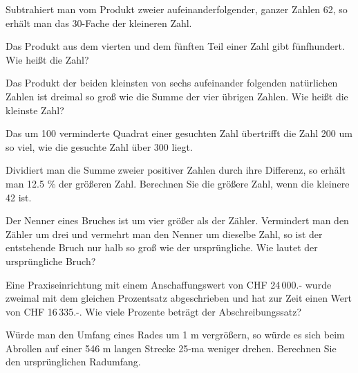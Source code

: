 \begin{bbwAufgabenBlock}
\item Subtrahiert man vom Produkt zweier aufeinanderfolgender, ganzer
Zahlen 62, so erhält man das 30-Fache der kleineren Zahl.


\item Das Produkt aus dem vierten und dem fünften Teil einer Zahl gibt
fünfhundert. Wie heißt die Zahl?


\item Das Produkt der beiden kleinsten von sechs aufeinander folgenden
natürlichen Zahlen ist dreimal so groß wie die Summe der vier übrigen
Zahlen. Wie heißt die kleinste Zahl?


\item Das um 100 verminderte Quadrat einer gesuchten Zahl übertrifft
die Zahl 200 um so viel, wie die gesuchte Zahl über 300 liegt.


\item Dividiert man die Summe zweier positiver Zahlen durch ihre
Differenz, so erhält man 12.5 \% der größeren Zahl. Berechnen Sie die
größere Zahl, wenn die kleinere 42 ist.


\item Der Nenner eines Bruches ist um vier größer als der
Zähler. Vermindert man den Zähler um drei und vermehrt man den Nenner
um dieselbe Zahl, so ist der entstehende Bruch nur halb so groß wie
der ursprüngliche. Wie lautet der ursprüngliche Bruch?


\item Eine Praxiseinrichtung mit einem Anschaffungswert von CHF
24\,000.- wurde zweimal mit dem gleichen Prozentsatz abgeschrieben und
hat zur Zeit einen Wert von CHF 16\,335.-. Wie viele Prozente beträgt
der Abschreibungssatz?


\item Würde man den Umfang eines Rades um 1 m vergrößern, so würde es
sich beim Abrollen auf einer 546 m langen Strecke 25-ma weniger
drehen. Berechnen Sie den ursprünglichen Radumfang.


\end{bbwAufgabenBlock}

